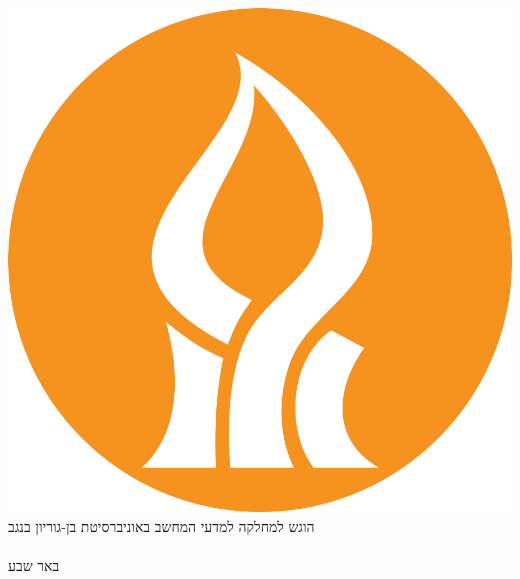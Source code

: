 \documentclass[12pt,a4paper,\pagelayoutformat,onecolumn]{book}
\newcommand\blankPageWithoutFooter{
\newpage
\mbox{}
\thispagestyle{empty} %
\newpage
}
\begin{document}
\begin{center}
\includegraphics[scale=0.4]{../01Cover/Images/logoBGU}\\
\vspace{9mm}
{\large הוגש למחלקה למדעי המחשב באוניברסיטת בן-גוריון בנגב
}\\
\vspace{5em}
{\large 
    \makeatletter
    \def\@FormatForHebrew#1#2#3{%
    \HebrewMonthName{#2}{#3}~%
    \HebrewYearName{#3}}
    \makeatother
    \textsc{\hebrewdate{\submitday}{\submitmonth}{\submityear}}
}\\
\vspace{2em}
{\large\textsc{באר שבע}}
\end{center}
\thispagestyle{empty} %
\cleardoublepage
\end{document}
